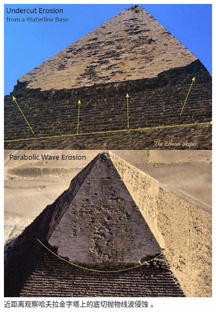 \documentclass[10pt,twocolumn,letterpaper]{article}
\begin{document}
\begin{figure}[H]
\begin{center}
   \includegraphics[width=1\linewidth]{wave.jpg}
\end{center}
   \caption{近距离观察哈夫拉金字塔上的底切抛物线波侵蚀 \cite{27}。}
\label{fig:19}
\label{fig:onecol}
\end{figure}
\end{document}
